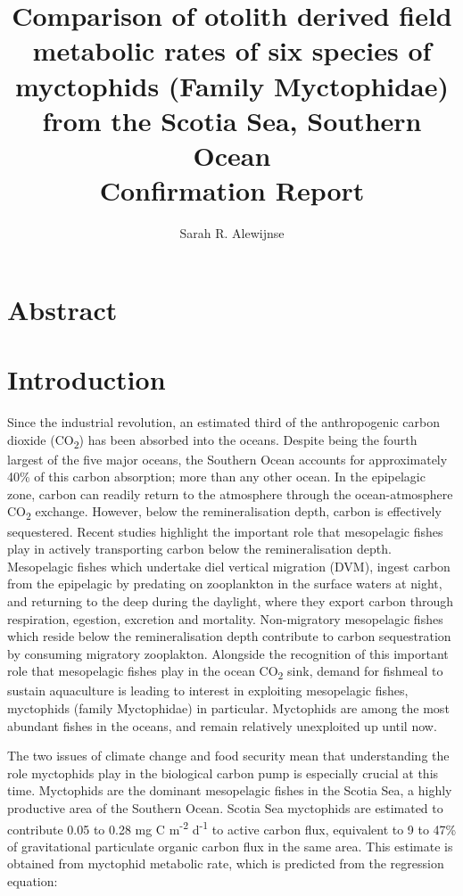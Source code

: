 \documentclass[12pt, titlepage]{article}
\title{Comparison of otolith derived field metabolic rates of six species of myctophids (Family Myctophidae) from the Scotia Sea, Southern Ocean\\
\large{Confirmation Report}}
\author{Sarah R. Alewijnse}
\begin{document}
\maketitle
\tableofcontents
\pagebreak

\section{Abstract}

\section{Introduction}

Since the industrial revolution, an estimated third of the anthropogenic carbon dioxide (CO\textsubscript{2}) has been absorbed into the oceans. %
Despite being the fourth largest of the five major oceans, the Southern Ocean accounts for approximately 40\% of this carbon absorption; more than any other ocean. %
In the epipelagic zone, carbon can readily return to the atmosphere through the ocean-atmosphere CO\textsubscript{2} exchange.
However, below the remineralisation depth, carbon is effectively sequestered. 
Recent studies highlight the important role that mesopelagic fishes play in actively transporting carbon below the remineralisation depth. %
Mesopelagic fishes which undertake diel vertical migration (DVM),  ingest carbon from the epipelagic by predating on zooplankton in the surface waters at night, and returning to the deep during the daylight, where they export carbon through respiration, egestion, excretion and mortality. 
Non-migratory mesopelagic fishes which reside below the remineralisation depth contribute to carbon sequestration by consuming migratory zooplakton. %
Alongside the recognition of this important role that mesopelagic fishes play in the ocean CO\textsubscript{2} sink, demand for fishmeal to sustain aquaculture is leading to interest in exploiting mesopelagic fishes, myctophids (family Myctophidae) in particular.
Myctophids are among the most abundant fishes in the oceans, and remain relatively unexploited up until now. %

The two issues of climate change and food security mean that understanding the role myctophids play in the biological carbon pump is especially crucial at this time.
Myctophids are the dominant mesopelagic fishes in the Scotia Sea, a highly productive area of the Southern Ocean. %
Scotia Sea myctophids are estimated to contribute 0.05 to 0.28 mg C m\textsuperscript{-2} d\textsuperscript{-1} to active carbon flux, equivalent to 9 to 47\% of gravitational particulate organic carbon flux in the same area. %
This estimate is obtained from myctophid metabolic rate, which is predicted from the regression equation:
\end{document}
